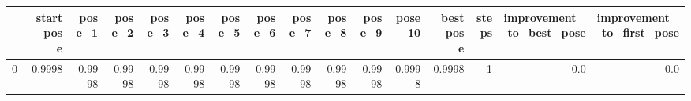 \begin{tabular}{lrrrrrrrrrrrrrrr}
\toprule
{} &  start\_pose &  pose\_1 &  pose\_2 &  pose\_3 &  pose\_4 &  pose\_5 &  pose\_6 &  pose\_7 &  pose\_8 &  pose\_9 &  pose\_10 &  best\_pose &  steps &  improvement\_to\_best\_pose &  improvement\_to\_first\_pose \\
\midrule
0 &      0.9998 &  0.9998 &  0.9998 &  0.9998 &  0.9998 &  0.9998 &  0.9998 &  0.9998 &  0.9998 &  0.9998 &   0.9998 &     0.9998 &      1 &                      -0.0 &                        0.0 \\
\bottomrule
\end{tabular}

